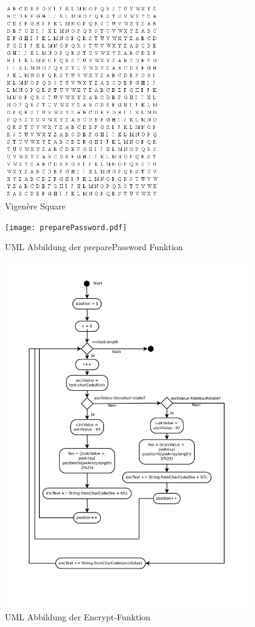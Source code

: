 \documentclass[11pt,paper=a4,final]{scrartcl}
\begin{document}
\begin{figure}[h!]
  \centering
  \includegraphics[width=0.6\textwidth]{square.png}
  \caption{Vigen\`ere Square}
  \label{fig:square}
\end{figure}
\newpage
\begin{figure}[h!]
  \centering
  \texttt{[image: preparePassword.pdf]}
  \caption{UML Abbildung der preparePassword Funktion}
  \label{fig:preparePassword}
\end{figure}
\newpage
\begin{figure}[h!]
  \centering
  \includegraphics[width=0.95\textwidth]{encrypt.pdf}
  \caption{UML Abbildung der Encrypt-Funktion}
  \label{fig:encrypt}
\end{figure}
\end{document}
